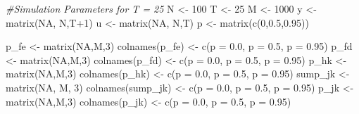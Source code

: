 \documentclass[
]{article}
\newenvironment{Shaded}{\begin{snugshade}}{\end{snugshade}}
\newcommand{\CommentTok}[1]{\textcolor[rgb]{0.56,0.35,0.01}{\textit{#1}}}
\newcommand{\ConstantTok}[1]{\textcolor[rgb]{0.00,0.00,0.00}{#1}}
\newcommand{\DecValTok}[1]{\textcolor[rgb]{0.00,0.00,0.81}{#1}}
\newcommand{\FloatTok}[1]{\textcolor[rgb]{0.00,0.00,0.81}{#1}}
\newcommand{\FunctionTok}[1]{\textcolor[rgb]{0.00,0.00,0.00}{#1}}
\newcommand{\NormalTok}[1]{#1}
\newcommand{\OtherTok}[1]{\textcolor[rgb]{0.56,0.35,0.01}{#1}}
\newcommand{\SpecialCharTok}[1]{\textcolor[rgb]{0.00,0.00,0.00}{#1}}
\newcommand{\StringTok}[1]{\textcolor[rgb]{0.31,0.60,0.02}{#1}}
\begin{document}
\begin{Shaded}
\begin{Highlighting}[]
\CommentTok{\#Simulation Parameters for T = 25}
\NormalTok{N }\OtherTok{\textless{}{-}} \DecValTok{100}
\NormalTok{T }\OtherTok{\textless{}{-}} \DecValTok{25}
\NormalTok{M }\OtherTok{\textless{}{-}} \DecValTok{1000}
\NormalTok{y }\OtherTok{\textless{}{-}} \FunctionTok{matrix}\NormalTok{(}\ConstantTok{NA}\NormalTok{, N,T}\SpecialCharTok{+}\DecValTok{1}\NormalTok{)}
\NormalTok{u }\OtherTok{\textless{}{-}} \FunctionTok{matrix}\NormalTok{(}\ConstantTok{NA}\NormalTok{, N,T)}
\NormalTok{p }\OtherTok{\textless{}{-}} \FunctionTok{matrix}\NormalTok{(}\FunctionTok{c}\NormalTok{(}\DecValTok{0}\NormalTok{,}\FloatTok{0.5}\NormalTok{,}\FloatTok{0.95}\NormalTok{))}

\NormalTok{p\_fe }\OtherTok{\textless{}{-}} \FunctionTok{matrix}\NormalTok{(}\ConstantTok{NA}\NormalTok{,M,}\DecValTok{3}\NormalTok{)}
\FunctionTok{colnames}\NormalTok{(p\_fe) }\OtherTok{\textless{}{-}} \FunctionTok{c}\NormalTok{(}\StringTok{\textquotesingle{}p = 0.0\textquotesingle{}}\NormalTok{, }\StringTok{\textquotesingle{}p = 0.5\textquotesingle{}}\NormalTok{, }\StringTok{\textquotesingle{}p = 0.95\textquotesingle{}}\NormalTok{)}
\NormalTok{p\_fd }\OtherTok{\textless{}{-}} \FunctionTok{matrix}\NormalTok{(}\ConstantTok{NA}\NormalTok{,M,}\DecValTok{3}\NormalTok{)}
\FunctionTok{colnames}\NormalTok{(p\_fd) }\OtherTok{\textless{}{-}} \FunctionTok{c}\NormalTok{(}\StringTok{\textquotesingle{}p = 0.0\textquotesingle{}}\NormalTok{, }\StringTok{\textquotesingle{}p = 0.5\textquotesingle{}}\NormalTok{, }\StringTok{\textquotesingle{}p = 0.95\textquotesingle{}}\NormalTok{)}
\NormalTok{p\_hk }\OtherTok{\textless{}{-}} \FunctionTok{matrix}\NormalTok{(}\ConstantTok{NA}\NormalTok{,M,}\DecValTok{3}\NormalTok{)}
\FunctionTok{colnames}\NormalTok{(p\_hk) }\OtherTok{\textless{}{-}} \FunctionTok{c}\NormalTok{(}\StringTok{\textquotesingle{}p = 0.0\textquotesingle{}}\NormalTok{, }\StringTok{\textquotesingle{}p = 0.5\textquotesingle{}}\NormalTok{, }\StringTok{\textquotesingle{}p = 0.95\textquotesingle{}}\NormalTok{)}
\NormalTok{sump\_jk }\OtherTok{\textless{}{-}} \FunctionTok{matrix}\NormalTok{(}\ConstantTok{NA}\NormalTok{, M, }\DecValTok{3}\NormalTok{)}
\FunctionTok{colnames}\NormalTok{(sump\_jk) }\OtherTok{\textless{}{-}} \FunctionTok{c}\NormalTok{(}\StringTok{\textquotesingle{}p = 0.0\textquotesingle{}}\NormalTok{, }\StringTok{\textquotesingle{}p = 0.5\textquotesingle{}}\NormalTok{, }\StringTok{\textquotesingle{}p = 0.95\textquotesingle{}}\NormalTok{)}
\NormalTok{p\_jk }\OtherTok{\textless{}{-}} \FunctionTok{matrix}\NormalTok{(}\ConstantTok{NA}\NormalTok{,M,}\DecValTok{3}\NormalTok{)}
\FunctionTok{colnames}\NormalTok{(p\_jk) }\OtherTok{\textless{}{-}} \FunctionTok{c}\NormalTok{(}\StringTok{\textquotesingle{}p = 0.0\textquotesingle{}}\NormalTok{, }\StringTok{\textquotesingle{}p = 0.5\textquotesingle{}}\NormalTok{, }\StringTok{\textquotesingle{}p = 0.95\textquotesingle{}}\NormalTok{)}


\end{Highlighting}
\end{Shaded}
\end{document}
